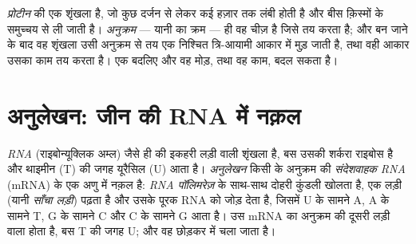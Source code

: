 \begin{definition}[प्रोटीन, ऐमीनो अम्ल अनुक्रम]\label{def:g11:gene-expression:protein}
\emph{प्रोटीन}  की एक शृंखला है, जो कुछ दर्जन
से लेकर कई हज़ार तक लंबी होती है और बीस क़िस्मों के समुच्चय से ली जाती है।
\emph{अनुक्रम} --- यानी  का क्रम --- ही वह चीज़ है जिसे  तय
करता है; और बन जाने के बाद वह शृंखला उसी अनुक्रम से तय एक निश्चित
त्रि-आयामी आकार में मुड़ जाती है, तथा वही आकार उसका काम तय करता है। एक
 बदलिए और वह मोड़, तथा वह काम, बदल सकता है।
\end{definition}

\section{अनुलेखन: जीन की RNA में नक़ल}

\begin{definition}[संदेशवाहक RNA और अनुलेखन]\label{def:g11:gene-expression:transcription}
\emph{RNA} (राइबोन्यूक्लिक अम्ल)  जैसे ही 
की इकहरी लड़ी वाली शृंखला है, बस उसकी शर्करा राइबोस है और थाइमीन (T) की
जगह  यूरैसिल (U) आता है। \emph{अनुलेखन} किसी  के
अनुक्रम की \emph{संदेशवाहक RNA} (mRNA) के एक अणु में
नक़ल है:  \emph{RNA पॉलिमरेज़}  के साथ-साथ दोहरी कुंडली खोलता
है, एक लड़ी (यानी \emph{साँचा लड़ी}) पढ़ता है और उसके पूरक RNA को जोड़ देता
है, जिसमें U के सामने A, A के सामने T, G के सामने C और C के सामने G आता
है। उस mRNA का अनुक्रम  की दूसरी लड़ी वाला होता है, बस T की जगह U; और
वह  छोड़कर  में चला जाता है।
\end{definition}

